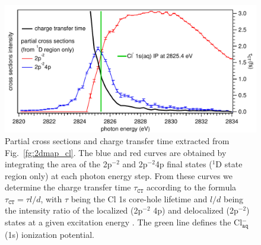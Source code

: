 \documentclass[journal=jacsat,manuscript=article]{achemso}
\begin{document}
\begin{figure}
\centering
\includegraphics[scale=0.9]{figures/partial_cross_sec_ct_time.pdf}
\caption{Partial cross sections and charge transfer time extracted from Fig.\ \ref{fg:2dmap_cl}. The blue and red curves are obtained by integrating the area of the 2p$^{-2}$ and 2p$^{-2}$4p final states ($^1$D state region only) at each photon energy step. From these curves we determine the charge transfer time $\tau_{\texttt{CT}}$ according to the formula $\tau_{\texttt{CT}} = \tau l/d$, with $\tau$ being the Cl 1s core-hole lifetime and $l/d$ being the intensity ratio of the localized (2p$^{-2}$ 4p) and delocalized (2p$^{-2}$) states at a given excitation energy \cite{foehlisch05:373}.  The green line defines the Cl$^{-}_{\texttt{aq}}$(1s) ionization potential.}
\label{fg:si_ct_time}
\end{figure}



%
\end{document}
